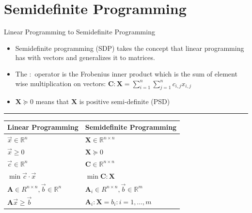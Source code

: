 \documentclass[
	11pt, %
]{beamer}
\begin{document}
\section{Semidefinite Programming}
\begin{frame}[label={sec:org73100b6}]{Linear Programming to Semidefinite Programming}
\begin{itemize}
\item Semidefinite programming (SDP) takes the concept that linear programming has
with vectors and generalizes it to matrices.
\end{itemize}

\begin{itemize}
\item The \( : \) operator is the Frobenius inner product which is the sum of element wise multiplication on vectors:
\( \mathbf{C} : \mathbf{X} = \sum_{i = 1}^n \sum_{j = 1}^n c_{i, j} x_{i, j} \)
\item \( \mathbf{X} \succeq 0 \) means that \( \mathbf{X} \) is positive semi-definite (PSD)
\end{itemize}
\noindent\rule{\textwidth}{0.5pt}
\begin{center}
\begin{tabular}{ll}
Linear Programming & Semidefinite Programming\\[0pt]
\hline
\(\vec{x} \in \mathbb{R}^n\) & \(\mathbf{X} \in \mathbb{R}^{n \times n}\)\\[0pt]
\(\vec{x} \geq 0\) & \(\mathbf{X} \succeq 0\)\\[0pt]
\(\vec{c} \in \mathbb{R}^n\) & \(\mathbf{C} \in \mathbb{R}^{n \times n}\)\\[0pt]
\(\min \vec{c} \cdot \vec{x}\) & \(\min \mathbf{C} : \mathbf{X}\)\\[0pt]
\(\mathbf{A} \in R^{n \times n}, \vec{b} \in \mathbb{R}^n\) & \(\mathbf{A}_{i} \in R^{n \times n}, \vec{b} \in \mathbb{R}^m\)\\[0pt]
\(\mathbf{A} \vec{x} \geq \vec{b}\) & \(\mathbf{A}_i : \mathbf{X} = b_i : i = 1, \ldots, m\)\\[0pt]
\end{tabular}
\end{center}

\pause
\end{frame}
\end{document}
